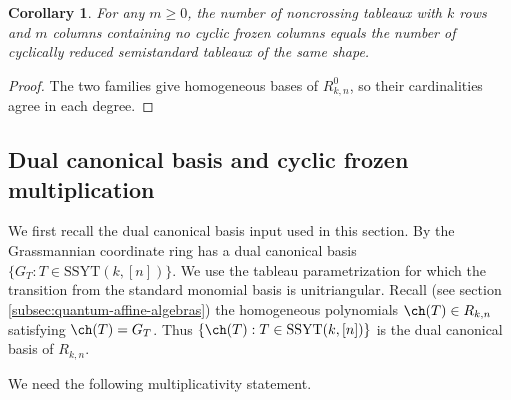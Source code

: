 \documentclass[11pt]{amsart}
\numberwithin{equation}{section}
\newtheorem{cor}[thm]{Corollary}
\newcommand{\SSYT}{\mathrm{SSYT}}
\begin{document}
\begin{cor}
For any $m\geq 0$, the number of noncrossing tableaux
with $k$ rows and $m$ columns containing no cyclic
frozen columns equals the number of cyclically reduced
semistandard tableaux of the same shape.
\end{cor}
\begin{proof}
The two families give homogeneous bases of
$R^0_{k,n}$, so their cardinalities agree in each degree.
\end{proof}

\subsection{Dual canonical basis and cyclic frozen multiplication}

We first recall the dual canonical basis input used in this section.
By \cite{Ka91,Lus93} the Grassmannian
coordinate ring has a dual canonical basis $\{G_T:T\in \SSYT(k,[n])\}$.
We use the tableau parametrization for which the transition from the
standard monomial basis is unitriangular.  Recall (see 
section \ref{subsec:quantum-affine-algebras}) the homogeneous polynomials
$\ch(T)\in R_{k,n}$ satisfying $\ch(T)=G_T$.
Thus $\{\ch(T):T\in \SSYT(k,[n])\}$ is the dual canonical basis of $R_{k,n}$.

We need the following multiplicativity statement.
\end{document}

